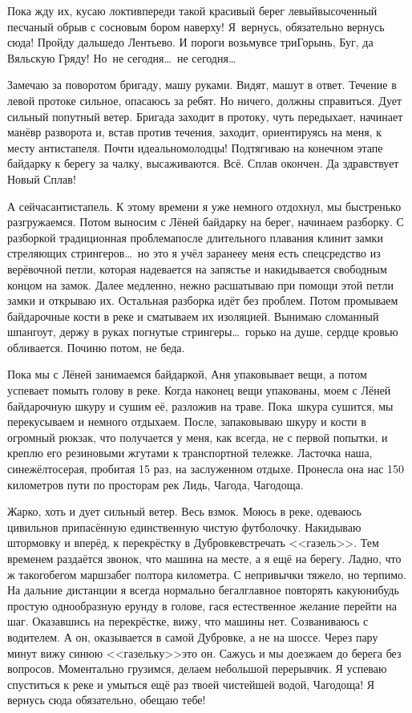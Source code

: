 Пока жду их, кусаю локти\mdash впереди такой красивый берег левый\mdash высоченный песчаный обрыв с сосновым бором наверху! Я~вернусь, обязательно вернусь сюда! Пройду дальше\mdash до Лентьево. И пороги возьму\mdash все три\mdash Горынь, Буг, да Вяльскую Гряду! Но~не сегодня\ldots~не сегодня\ldots 

Замечаю за поворотом бригаду, машу руками. Видят, машут в ответ. Течение в левой протоке сильное, опасаюсь за ребят. Но ничего, должны справиться. Дует сильный попутный ветер. Бригада заходит в протоку, чуть передыхает, начинает манёвр разворота и, встав против течения, заходит, ориентируясь на меня, к месту антистапеля. Почти идеально\mdash  молодцы! Подтягиваю на конечном этапе байдарку к берегу за чалку, высаживаются. Всё. Сплав окончен. Да здравствует Новый Сплав! 

А сейчас\mdash антистапель. К этому времени я уже немного отдохнул, мы быстренько разгружаемся. Потом выносим с Лёней байдарку на берег, начинаем разборку. С разборкой традиционная проблема\mdash после длительного плавания клинит замки стреляющих стрингеров\ldots~но это я учёл заранее\mdash у меня есть спецсредство из верёвочной петли, которая надевается на запястье и накидывается свободным концом на замок. Далее медленно, нежно расшатываю при помощи этой петли замки и открываю их. Остальная разборка идёт без проблем. Потом промываем байдарочные кости в реке и сматываем их изоляцией. Вынимаю сломанный шпангоут, держу в руках погнутые стрингеры\ldots~горько на душе, сердце кровью обливается. Починю потом, не беда. 

Пока мы с Лёней занимаемся байдаркой, Аня упаковывает вещи, а потом успевает помыть голову в реке. Когда наконец вещи упакованы, моем с Лёней байдарочную шкуру и сушим её, разложив на траве. Пока~шкура сушится, мы перекусываем и немного отдыхаем. После, запаковываю шкуру и кости в огромный рюкзак, что получается у меня, как всегда, не с первой попытки, и креплю его резиновыми жгутами к транспортной тележке. Ласточка наша, сине\sdash жёлто\sdash серая, пробитая 15 раз, на заслуженном отдыхе. Пронесла она нас 150 километров пути по просторам рек Лидь, Чагода, Чагодоща. 

Жарко, хоть и дует сильный ветер. Весь взмок. Моюсь в реке, одеваюсь цивильно\mdash в припасённую единственную чистую футболочку. Накидываю штормовку и вперёд, к перекрёстку в Дубровке\mdash встречать <<газель>>. Тем временем раздаётся звонок, что машина на месте, а я ещё на берегу. Ладно, что ж такого\mdash бегом марш\mdash забег полтора километра. С непривычки тяжело, но терпимо. На дальние дистанции я всегда нормально бегал\mdash главное повторять какую\sdash нибудь простую однообразную ерунду в голове, гася естественное желание перейти на шаг. Оказавшись на перекрёстке, вижу, что машины нет. Созваниваюсь с водителем. А он, оказывается в самой Дубровке, а не на шоссе. Через пару минут вижу синюю <<газельку>>\mdash это он. Сажусь и мы доезжаем до берега без вопросов. Моментально грузимся, делаем небольшой перерывчик. Я успеваю спуститься к реке и умыться ещё раз твоей чистейшей водой, Чагодоща! Я вернусь сюда обязательно, обещаю тебе!

